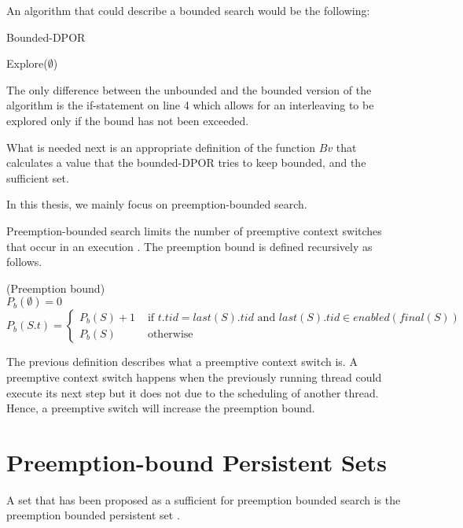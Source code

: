 An algorithm that could describe a bounded search would be the following:

\begin{algorithm}[H]
    \caption{Bounded-DPOR}
    Explore($\emptyset$)\;
\end{algorithm}

\noindent The only difference between the unbounded and the bounded version of the algorithm is the if-statement on line 4 which allows for an interleaving to be explored
only if the bound has not been exceeded.

What is needed next is an appropriate definition of the function $Bv$ that calculates a value that the bounded-DPOR tries to keep bounded, 
and the sufficient set. 

In this thesis, we mainly focus on preemption-bounded search. 

Preemption-bounded search limits the number of preemptive context switches that occur in an execution \cite{Musu07}. The 
preemption bound is defined recursively as follows.

\begin{definition}{(Preemption bound)}
\\
$P_b(\emptyset) = 0$ \\
$P_b(S.t) = 
 \begin{cases} 
    P_b(S) + 1 & \text{ if } t.tid = last(S).tid \text{ and } last(S).tid \in enabled(final(S)) \\
    P_b(S) & \text{ otherwise }
 \end{cases}
$\\
\end{definition}

The previous definition describes what a preemptive context switch is. A preemptive context switch happens when the previously running thread could execute
its next step but it does not due to the scheduling of another thread. Hence, a preemptive switch will increase the preemption bound.

\section{Preemption-bound Persistent Sets}

A set that has been proposed as a sufficient for preemption bounded search is the preemption bounded persistent set \cite{BPOR}.

